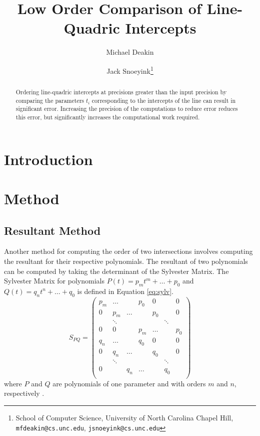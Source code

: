 \documentclass{cccg16}
\title{Low Order Comparison of Line-Quadric Intercepts}
\author{Michael Deakin \and
  Jack Snoeyink\thanks{School of Computer Science, University of North Carolina Chapel Hill, {\tt mfdeakin@cs.unc.edu}, {\tt jsnoeyink@cs.unc.edu}}}
\begin{document}
\thispagestyle{empty}
\maketitle

\begin{abstract}
Ordering line-quadric intercepts at precisions greater than the input
precision by comparing the parameters $t_i$ corresponding to the
intercepts of the line can result in significant error.  Increasing
the precision of the computations to reduce error reduces this error,
but significantly increases the computational work required.
\end{abstract}

\section{Introduction}
\section{Method}
\subsection{Resultant Method}
Another method for computing the order of two intersections involves
computing the resultant for their respective polynomials.  The
resultant of two polynomials can be computed by taking the determinant
of the Sylvester Matrix.  The Sylvester Matrix for polynomials
$P(t)=p_m t^m + \dots + p_0$ and $Q(t)=q_n t^n + \dots + q_0$ is
defined in Equation \ref{eq:sylv}.
\begin{equation}
  S_{PQ}=\begin{pmatrix}
    p_m & \dots & & p_0 & 0 & & 0\\
    0 & p_m & \dots & & p_0 & & 0\\
    & \ddots & & & & \ddots\\
    0 & 0 & & p_m & \dots & & p_0\\
    q_n & \dots & & q_0 & 0 & & 0\\
    0 & q_n & \dots & & q_0 & & 0\\
    & \ddots & & & & \ddots\\
    0 & & q_n & \dots & & q_0\\
  \end{pmatrix}
  \label{eq:sylv}
\end{equation}
where $P$ and $Q$ are polynomials of one parameter and with orders $m$
and $n$, respectively \cite[Section~3.5]{cheeyap}.
\end{document}
